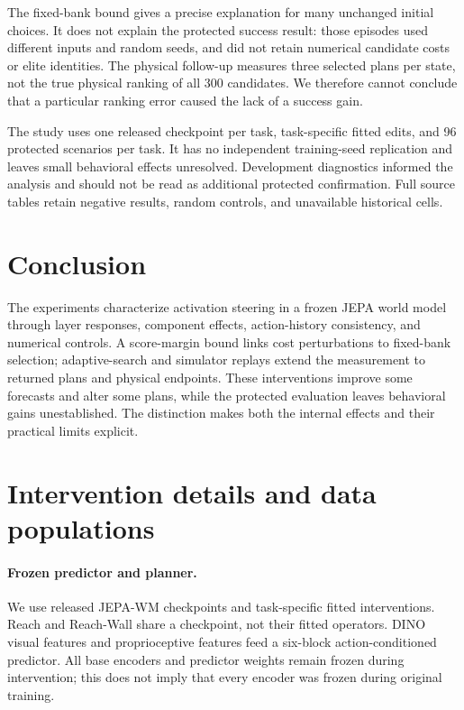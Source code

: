 \documentclass{article}
\begin{document}
The fixed-bank bound gives a precise explanation for many unchanged initial choices. It does not explain the protected success result: those episodes used different inputs and random seeds, and did not retain numerical candidate costs or elite identities. The physical follow-up measures three selected plans per state, not the true physical ranking of all 300 candidates. We therefore cannot conclude that a particular ranking error caused the lack of a success gain.

The study uses one released checkpoint per task, task-specific fitted edits, and 96 protected scenarios per task. It has no independent training-seed replication and leaves small behavioral effects unresolved. Development diagnostics informed the analysis and should not be read as additional protected confirmation. Full source tables retain negative results, random controls, and unavailable historical cells.

\section{Conclusion}

The experiments characterize activation steering in a frozen JEPA world model through layer responses, component effects, action-history consistency, and numerical controls. A score-margin bound links cost perturbations to fixed-bank selection; adaptive-search and simulator replays extend the measurement to returned plans and physical endpoints. These interventions improve some forecasts and alter some plans, while the protected evaluation leaves behavioral gains unestablished. The distinction makes both the internal effects and their practical limits explicit.

\clearpage

{\small}
\clearpage
\appendix
\clearpage
\section{Intervention details and data populations}
\label{sec:design}

\paragraph{Frozen predictor and planner.}
We use released JEPA-WM checkpoints and task-specific fitted interventions. Reach and Reach-Wall share a checkpoint, not their fitted operators. DINO visual features and proprioceptive features feed a six-block action-conditioned predictor. All base encoders and predictor weights remain frozen during intervention; this does not imply that every encoder was frozen during original training.
\end{document}
